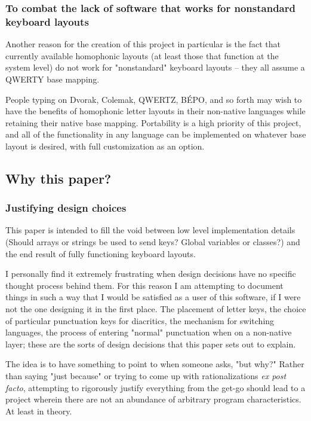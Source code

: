 \documentclass[11pt]{article}
\begin{document}
\subsubsection{To combat the lack of software that works for nonstandard keyboard layouts}
\label{sec:orgf1b45a2}

Another reason for the creation of this project in particular is the fact that currently available homophonic layouts (at least those that function at the system level) do not work for "nonstandard" keyboard layouts -- they all assume a QWERTY base mapping.

People typing on Dvorak, Colemak, QWERTZ, BÉPO, and so forth may wish to have the benefits of homophonic letter layouts in their non-native languages while retaining their native base mapping. Portability is a high priority of this project, and all of the functionality in any language can be implemented on whatever base layout is desired, with full customization as an option.

\subsection{Why this paper?}
\label{sec:orgb9df7a2}

\subsubsection{Justifying design choices}
\label{sec:org2737a23}

This paper is intended to fill the void between low level implementation details (Should arrays or strings be used to send keys? Global variables or classes?) and the end result of fully functioning keyboard layouts.

I personally find it extremely frustrating when design decisions have no specific thought process behind them. For this reason I am attempting to document things in such a way that I would be satisfied as a user of this software, if I were not the one designing it in the first place. The placement of letter keys, the choice of particular punctuation keys for diacritics, the mechanism for switching languages, the process of entering "normal" punctuation when on a non-native layer; these are the sorts of design decisions that this paper sets out to explain.

The idea is to have something to point to when someone asks, "but why?" Rather than saying "just because" or trying to come up with rationalizations \emph{ex post facto}, attempting to rigorously justify everything from the get-go should lead to a project wherein there are not an abundance of arbitrary program characteristics. At least in theory.
\end{document}
